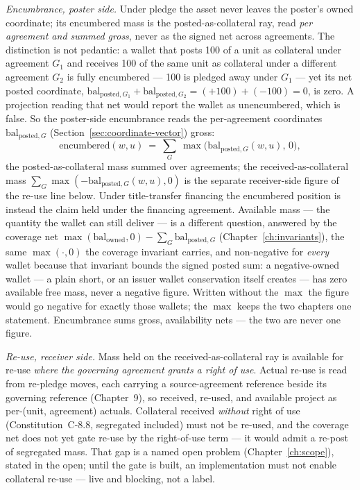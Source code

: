 \documentclass[11pt,a4paper]{article}
\begin{document}
\emph{Encumbrance, poster side.} Under pledge the asset never leaves the
poster's owned coordinate; its encumbered mass is the posted-as-collateral ray,
read \emph{per agreement and summed gross}, never as the signed net across
agreements. The distinction is not pedantic: a wallet that posts 100 of a unit as
collateral under agreement $G_1$ and receives 100 of the same unit as collateral
under a different agreement $G_2$ is fully encumbered --- 100 is pledged away under
$G_1$ --- yet its net posted coordinate,
$\mathrm{bal}_{\text{posted},G_1}+\mathrm{bal}_{\text{posted},G_2}=(+100)+(-100)=0$,
is zero. A projection reading that net would report the wallet as unencumbered,
which is false. So the poster-side encumbrance reads the per-agreement coordinates
$\mathrm{bal}_{\text{posted},G}$ (Section~\ref{sec:coordinate-vector})
gross:
\[
\text{encumbered}(w,u)\ =\ \sum_{G}\ \max\bigl(\mathrm{bal}_{\text{posted},G}(w,u),\,0\bigr),
\]
the posted-as-collateral mass summed over agreements; the received-as-collateral
mass $\sum_{G}\max(-\mathrm{bal}_{\text{posted},G}(w,u),0)$ is the separate
receiver-side figure of the re-use line below. Under title-transfer financing the
encumbered position is instead the claim held under the financing agreement.
Available mass --- the quantity the wallet can still deliver --- is a different
question, answered by the coverage net $\max(\mathrm{bal}_{\text{owned}},0)-\sum_G
\mathrm{bal}_{\text{posted},G}$ (Chapter~\ref{ch:invariants}), the same
$\max(\cdot,0)$ the coverage invariant carries, and non-negative for \emph{every}
wallet because that invariant bounds the signed posted sum: a negative-owned wallet ---
a plain short, or an issuer wallet conservation itself creates --- has zero available
free mass, never a negative figure. Written without the $\max$ the figure would go
negative for exactly those wallets; the $\max$ keeps the two chapters one statement.
Encumbrance sums gross, availability nets --- the two are never one figure.

\emph{Re-use, receiver side.} Mass held on the received-as-collateral ray is
available for re-use \emph{where the governing agreement grants a right of use}.
Actual re-use is read from re-pledge moves, each carrying a source-agreement reference
beside its governing reference (Chapter~9), so received, re-used, and available project as
per-(unit, agreement) actuals. Collateral received \emph{without} right of use
(Constitution~C-8.8, segregated included) must not be re-used, and the coverage net does
not yet gate re-use by the right-of-use term --- it would admit a re-post of segregated
mass. That gap is a named open problem (Chapter~\ref{ch:scope}), stated in the open;
until the gate is built, an implementation must not enable collateral re-use --- live and
blocking, not a label.
\end{document}
